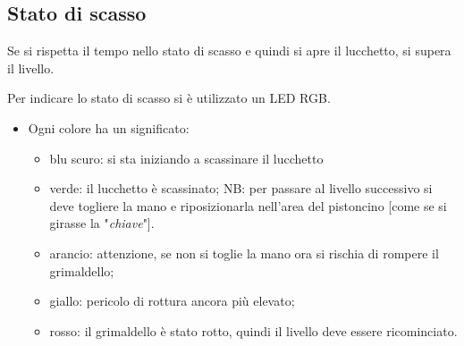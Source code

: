 \clearpage
\subsection{Stato di scasso}\label{sec:statodiscasso}
Se si rispetta il tempo nello stato di scasso e quindi si apre il lucchetto, si supera il livello.

Per indicare lo stato di scasso si è utilizzato un LED RGB. 
\begin{itemize}
	\item Ogni colore ha un significato:
	\begin{itemize}
		\item blu scuro: si sta iniziando a scassinare il lucchetto
		\item verde: il lucchetto è scassinato;
			\subitem NB: per passare al livello successivo si deve togliere la mano e riposizionarla nell'area del pistoncino [come se si girasse la "\textit{chiave}"].
		\item arancio: attenzione, se non si toglie la mano ora si rischia di rompere il grimaldello;
		\item giallo: pericolo di rottura ancora più elevato;
		\item rosso: il grimaldello è stato rotto, quindi il livello deve essere ricominciato.
	\end{itemize}	
\end{itemize}

